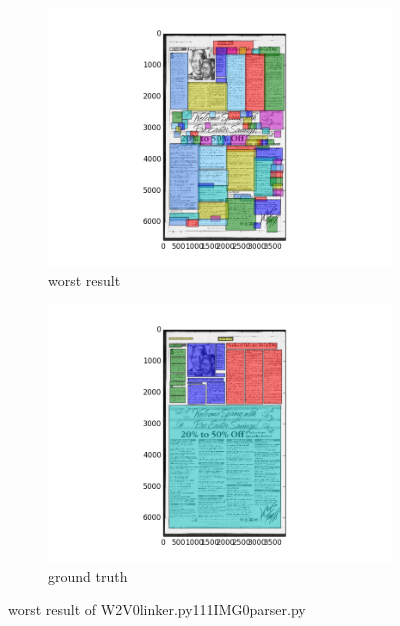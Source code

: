 \documentclass[a4paper,10pt]{article}
\begin{document}
					\begin{figure}
					\centering
					\begin{subfigure}{.5\textwidth}
					  \centering
					  \includegraphics[width=10cm]
					{W2V0linker.py111IMG0parser.py.worst.png}
					  \caption{worst result}
					  \label{fig:sub1}
					\end{subfigure}%
					\begin{subfigure}{.5\textwidth}
					  \centering
					  \includegraphics[width=10cm]
					{W2V0linker.py111IMG0parser.py.gt.worst.png}
					  \caption{ground truth}
					  \label{fig:sub2}
					\end{subfigure}
					\caption
					{worst result of W2V0linker.py111IMG0parser.py}
					\label{fig:test}
					\end{figure}
					
\end{document}
